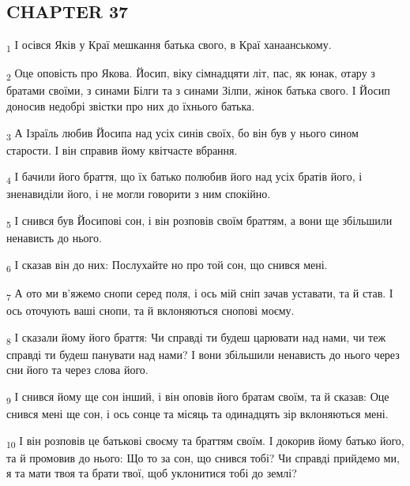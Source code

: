 \subsection{CHAPTER 37}
\begin{tcolorbox}
\textsubscript{1} І осівся Яків у Краї мешкання батька свого, в Краї ханаанському.
\end{tcolorbox}
\begin{tcolorbox}
\textsubscript{2} Оце оповість про Якова. Йосип, віку сімнадцяти літ, пас, як юнак, отару з братами своїми, з синами Білги та з синами Зілпи, жінок батька свого. І Йосип доносив недобрі звістки про них до їхнього батька.
\end{tcolorbox}
\begin{tcolorbox}
\textsubscript{3} А Ізраїль любив Йосипа над усіх синів своїх, бо він був у нього сином старости. І він справив йому квітчасте вбрання.
\end{tcolorbox}
\begin{tcolorbox}
\textsubscript{4} І бачили його браття, що їх батько полюбив його над усіх братів його, і зненавиділи його, і не могли говорити з ним спокійно.
\end{tcolorbox}
\begin{tcolorbox}
\textsubscript{5} І снився був Йосипові сон, і він розповів своїм браттям, а вони ще збільшили ненависть до нього.
\end{tcolorbox}
\begin{tcolorbox}
\textsubscript{6} І сказав він до них: Послухайте но про той сон, що снився мені.
\end{tcolorbox}
\begin{tcolorbox}
\textsubscript{7} А ото ми в'яжемо снопи серед поля, і ось мій сніп зачав уставати, та й став. І ось оточують ваші снопи, та й вклоняються снопові моєму.
\end{tcolorbox}
\begin{tcolorbox}
\textsubscript{8} І сказали йому його браття: Чи справді ти будеш царювати над нами, чи теж справді ти будеш панувати над нами? І вони збільшили ненависть до нього через сни його та через слова його.
\end{tcolorbox}
\begin{tcolorbox}
\textsubscript{9} І снився йому ще сон інший, і він оповів його братам своїм, та й сказав: Оце снився мені ще сон, і ось сонце та місяць та одинадцять зір вклоняються мені.
\end{tcolorbox}
\begin{tcolorbox}
\textsubscript{10} І він розповів це батькові своєму та браттям своїм. І докорив йому батько його, та й промовив до нього: Що то за сон, що снився тобі? Чи справді прийдемо ми, я та мати твоя та брати твої, щоб уклонитися тобі до землі?
\end{tcolorbox}
